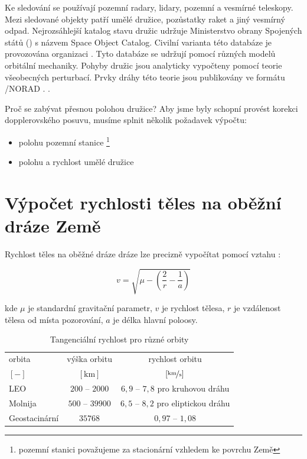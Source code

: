 Ke sledování se používají pozemní radary, lidary, pozemní  a vesmírné teleskopy. Mezi sledované objekty patří umělé družice, pozůstatky raket a jiný vesmírný odpad. Nejrozsáhlejší katalog stavu družic udržuje Ministerstvo obrany Spojených států () s názvem Space Object Catalog. Civilní varianta této databáze je provozována organizaci . Tyto databáze se udržují pomocí různých modelů orbitální mechaniky. Pohyby družic jsou analyticky vypočteny pomocí teorie všeobecných perturbací. Prvky dráhy této teorie jsou publikovány ve formátu /NORAD . \cite{wiki:US_space_surv}.

Proč se zabývat přesnou polohou družice? Aby jsme byly schopní provést korekci dopplerovského posuvu, musíme splnit několik požadavek výpočtu:
\begin{itemize}
  \item polohu pozemní stanice \footnote{pozemní stanici považujeme za stacionární vzhledem ke povrchu Země}
  \item polohu a rychlost umělé družice
\end{itemize}


\section{Výpočet rychlosti těles na oběžní dráze Země}
  Rychlost těles na oběžné dráze dráze lze precizně vypočítat pomocí vztahu \cite{wiki:orb_speed}:

  \begin{equation}
    v = \sqrt{\mu - \left( \frac{2}{r} - \frac{1}{a} \right)}
  \end{equation}

  kde $\mu$ je standardní gravitační parametr, $v$ je rychlost tělesa, $r$ je vzdálenost tělesa od místa pozorování, $a$ je délka hlavní poloosy.

  \begin{table}[ht]
    \begin{tabular}{l | c c }
      orbita        & výška orbitu     & rychlost orbitu                        \\
      $[-]$         & $[\mathrm{km}]$  & $[\nicefrac{\mathrm{km}}{\mathrm{s}}]$ \\
      \hline
      LEO           & $200$ -- $2000$  & $6{,}9$ -- $7{,}8$ pro kruhovou dráhu  \\
      Molnija       & $500$ -- $39900$ & $6{,}5$ -- $8{,}2$ pro eliptickou dráhu\\
      Geostacinární & $35768$          & $0{,}97$ -- $1{,}08$
    \end{tabular}
    \caption{Tangenciální rychlost pro různé orbity \cite{wiki:orb_speed}}
  \end{table}


